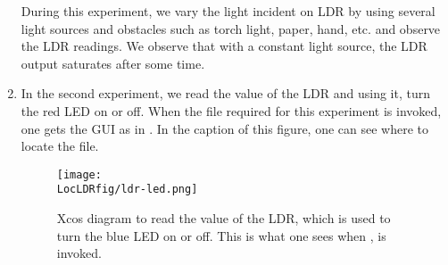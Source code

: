 \begin{enumerate}
  During this experiment, we vary the light incident on LDR by using
  several light sources and obstacles such as torch light, paper,
  hand, etc. and observe the LDR readings. We observe that with a
  constant light source, the LDR output saturates after some time. 


\item In the second experiment, we read the value of the LDR and using
  it, turn the red LED on or off.  When the file required for this
  experiment is invoked, one gets the GUI as in .
  In the caption of this figure, one can see where to locate the file.

  \begin{figure}
    \centering
    \texttt{[image: \\LocLDRfig/ldr-led.png]}
    \caption[Xcos diagram to read the value of the LDR, which is used
    to turn the blue LED on or off] {Xcos diagram to read the value of
      the LDR, which is used to turn the blue LED on or off.  This is
      what one sees when , is
      invoked.}
    \label{fig:ldr-led}
  \end{figure}


\end{enumerate}
